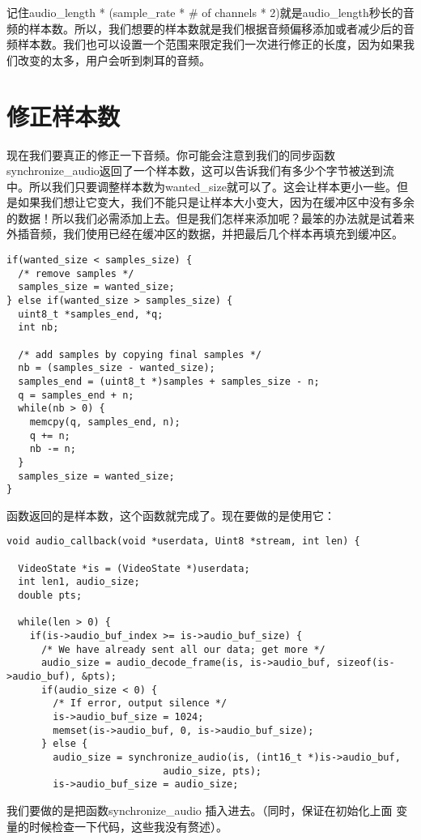 记住audio_length * (sample_rate * \# of channels * 2)就是audio_length秒长的音频的样本数。所以，我们想要的样本数就是我们根据音频偏移添加或者减少后的音频样本数。我们也可以设置一个范围来限定我们一次进行修正的长度，因为如果我们改变的太多，用户会听到刺耳的音频。

\section{修正样本数}

现在我们要真正的修正一下音频。你可能会注意到我们的同步函数synchronize_audio返回了一个样本数，这可以告诉我们有多少个字节被送到流中。所以我们只要调整样本数为wanted_size就可以了。这会让样本更小一些。但是如果我们想让它变大，我们不能只是让样本大小变大，因为在缓冲区中没有多余的数据！所以我们必需添加上去。但是我们怎样来添加呢？最笨的办法就是试着来外插音频，我们使用已经在缓冲区的数据，并把最后几个样本再填充到缓冲区。

\begin{lstlisting}
if(wanted_size < samples_size) {
  /* remove samples */
  samples_size = wanted_size;
} else if(wanted_size > samples_size) {
  uint8_t *samples_end, *q;
  int nb;

  /* add samples by copying final samples */
  nb = (samples_size - wanted_size);
  samples_end = (uint8_t *)samples + samples_size - n;
  q = samples_end + n;
  while(nb > 0) {
    memcpy(q, samples_end, n);
    q += n;
    nb -= n;
  }
  samples_size = wanted_size;
}
\end{lstlisting}

函数返回的是样本数，这个函数就完成了。现在要做的是使用它：

\begin{lstlisting}
void audio_callback(void *userdata, Uint8 *stream, int len) {

  VideoState *is = (VideoState *)userdata;
  int len1, audio_size;
  double pts;

  while(len > 0) {
    if(is->audio_buf_index >= is->audio_buf_size) {
      /* We have already sent all our data; get more */
      audio_size = audio_decode_frame(is, is->audio_buf, sizeof(is->audio_buf), &pts);
      if(audio_size < 0) {
		/* If error, output silence */
		is->audio_buf_size = 1024;
		memset(is->audio_buf, 0, is->audio_buf_size);
      } else {
		audio_size = synchronize_audio(is, (int16_t *)is->audio_buf,
						   audio_size, pts);
		is->audio_buf_size = audio_size;
\end{lstlisting}

我们要做的是把函数synchronize_audio 插入进去。（同时，保证在初始化上面
变量的时候检查一下代码，这些我没有赘述）。

